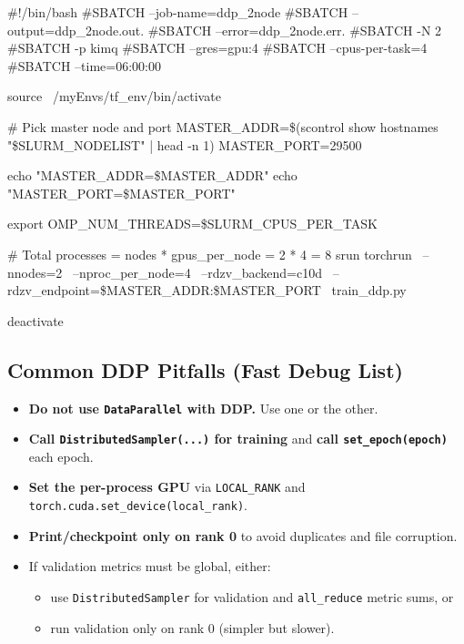 \documentclass[11pt]{article}
\begin{document}
\begin{codeblock}[caption={SLURM script for DDP on 2 nodes (\texttt{ddp\_2node.slurm})}]
#!/bin/bash
#SBATCH --job-name=ddp_2node
#SBATCH --output=ddp_2node.out.%
#SBATCH --error=ddp_2node.err.%
#SBATCH -N 2
#SBATCH -p kimq
#SBATCH --gres=gpu:4
#SBATCH --cpus-per-task=4
#SBATCH --time=06:00:00

source ~/myEnvs/tf_env/bin/activate

# Pick master node and port
MASTER_ADDR=\$(scontrol show hostnames "\$SLURM_NODELIST" | head -n 1)
MASTER_PORT=29500

echo "MASTER_ADDR=\$MASTER_ADDR"
echo "MASTER_PORT=\$MASTER_PORT"

export OMP_NUM_THREADS=\$SLURM_CPUS_PER_TASK

# Total processes = nodes * gpus_per_node = 2 * 4 = 8
srun torchrun \
  --nnodes=2 \
  --nproc_per_node=4 \
  --rdzv_backend=c10d \
  --rdzv_endpoint=\$MASTER_ADDR:\$MASTER_PORT \
  train_ddp.py

deactivate
\end{codeblock}

\subsection{Common DDP Pitfalls (Fast Debug List)}
\begin{itemize}[leftmargin=*]
  \item \textbf{Do not use \texttt{DataParallel} with DDP.} Use one or the other.
  \item \textbf{Call \texttt{DistributedSampler(...)} for training} and \textbf{call \texttt{set\_epoch(epoch)}} each epoch.
  \item \textbf{Set the per-process GPU} via \texttt{LOCAL\_RANK} and \texttt{torch.cuda.set\_device(local\_rank)}.
  \item \textbf{Print/checkpoint only on rank 0} to avoid duplicates and file corruption.
  \item If validation metrics must be global, either:
    \begin{itemize}
      \item use \texttt{DistributedSampler} for validation and \texttt{all\_reduce} metric sums, or
      \item run validation only on rank 0 (simpler but slower).
    \end{itemize}
\end{itemize}
\end{document}
